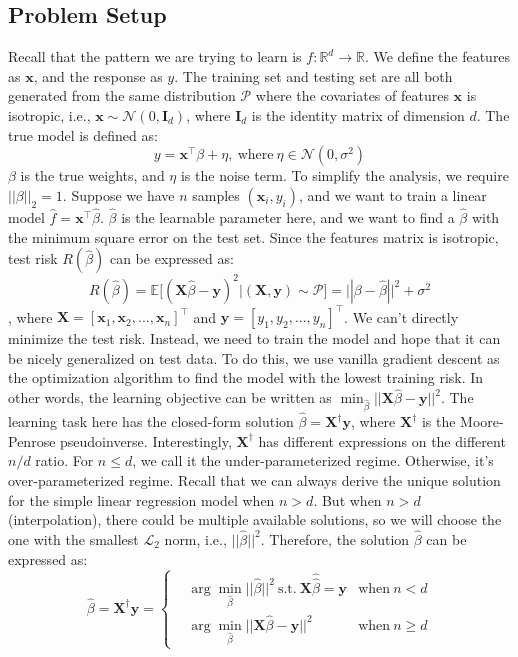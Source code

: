 \documentclass{article}
\begin{document}
\subsection{Problem Setup} \label{problem}
Recall that the pattern we are trying to learn is $f: \mathbb{R}^d \to \mathbb{R}$. We define the features as $\mathbf{x}$, and the response as $y$. The training set and testing set are all both generated from the same distribution $\mathcal{P}$ where the covariates of features $\mathbf{x}$ is isotropic, i.e., $\mathbf{x} \sim \mathcal{N}(0, \mathbf{I}_d)$, where $\mathbf{I}_d$ is the identity matrix of dimension $d$. The true model is defined as:
\begin{equation}
	y = \mathbf{x}^\intercal \beta + \eta, \ \text{where} \ \eta \in \mathcal{N}(0, \sigma^2)
\end{equation}
$\beta$ is the true weights, and $\eta$ is the noise term. To simplify the analysis, we require $||\beta||_2 = 1$. Suppose we have $n$ samples $(\mathbf{x}_i, y_i)$, and we want to train a linear model $\hat{f} = \mathbf{x}^\intercal \hat{\beta}$. $\hat{\beta}$ is the learnable parameter here, and we want to find a $\hat{\beta}$ with the minimum square error on the test set. Since the features matrix is isotropic, test risk $R(\hat{\beta})$ can be expressed as:
\begin{equation}
	R(\hat{\beta}) = \mathbb{E}[(\mathbf{X} \hat{\beta} - \mathbf{y})^2|(\mathbf{X}, \mathbf{y}) \sim \mathcal{P}] = ||\beta - \hat{\beta}||^2 + \sigma^2
\end{equation} 
, where $\mathbf{X} = [\mathbf{x}_1, \mathbf{x}_2, ..., \mathbf{x}_n]^\intercal$ and $\mathbf{y} = [y_1, y_2, ..., y_n]^\intercal$. We can't directly minimize the test risk. Instead, we need to train the model and hope that it can be nicely generalized on test data. To do this, we use vanilla gradient descent as the optimization algorithm to find the model with the lowest training risk. In other words, the learning objective can be written as $\min_{\hat{\beta}} ||\mathbf{X} \hat{\beta} - \mathbf{y}||^2$. The learning task here has the closed-form solution $\hat{\beta} = \mathbf{X}^\dagger\mathbf{y}$, where $\mathbf{X}^\dagger$ is the Moore-Penrose pseudoinverse. Interestingly, $\mathbf{X}^\dagger$ has different expressions on the different $n/d$ ratio. For $n \leq d$, we call it the under-parameterized regime. Otherwise, it's over-parameterized regime. Recall that we can always derive the unique solution for the simple linear regression model when $n > d$. But when $n > d$ (interpolation), there could be multiple available solutions, so we will choose the one with the smallest $\mathcal{L}_2$ norm, i.e., $||\hat{\beta}||^2$. Therefore, the solution $\hat{\beta}$ can be expressed as:
\begin{equation}
	\hat{\beta} = \mathbf{X}^\dagger \mathbf{y} = \left\{
	\begin{aligned}
		& \arg\min_{\hat{\beta}}||\hat{\beta}||^2 \  \text{s.t.} \ \mathbf{X}\hat{\hat{\beta}} = \mathbf{y} & \text{when} \ n < d\\
		& \arg\min_{\hat{\beta}}||\mathbf{X}\hat{\beta} - \mathbf{y}||^2 & \text{when} \ n \geq d
	\end{aligned}
	\right.
\end{equation}
\end{document}
